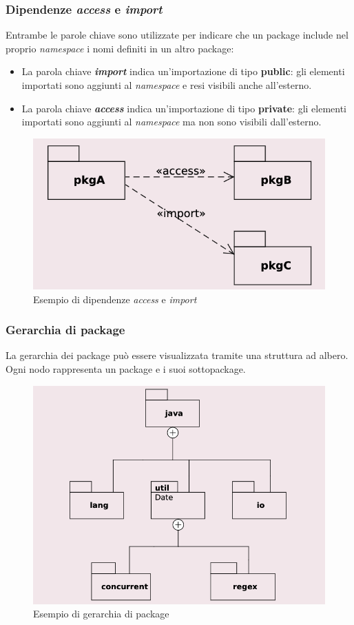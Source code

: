 \subsubsection{Dipendenze \textit{access} e \textit{import}}
Entrambe le parole chiave sono utilizzate per indicare che un package include nel proprio \textit{namespace} i nomi definiti in un altro package:
\begin{itemize}
    \item La parola chiave \textbf{\textit{import}} indica un’importazione di tipo \textbf{public}: gli elementi importati sono aggiunti al \textit{namespace} e resi visibili anche all’esterno.
    \item La parola chiave \textbf{\textit{access}} indica un’importazione di tipo \textbf{private}: gli elementi importati sono aggiunti al \textit{namespace} ma non sono visibili dall’esterno.
\end{itemize}

\begin{figure}[H]
    \centering
    \includegraphics[width=0.75\linewidth]{assets/UML/package/package-3.png}
    \caption{Esempio di dipendenze \textit{access} e \textit{import}}
\end{figure}

\subsubsection{Gerarchia di package}
La gerarchia dei package può essere visualizzata tramite una struttura ad albero. Ogni nodo rappresenta un package e i suoi sottopackage.

\begin{figure}[H]
    \centering
    \includegraphics[width=0.75\linewidth]{assets/UML/package/package-4.png}
    \caption{Esempio di gerarchia di package}
\end{figure}

\newpage